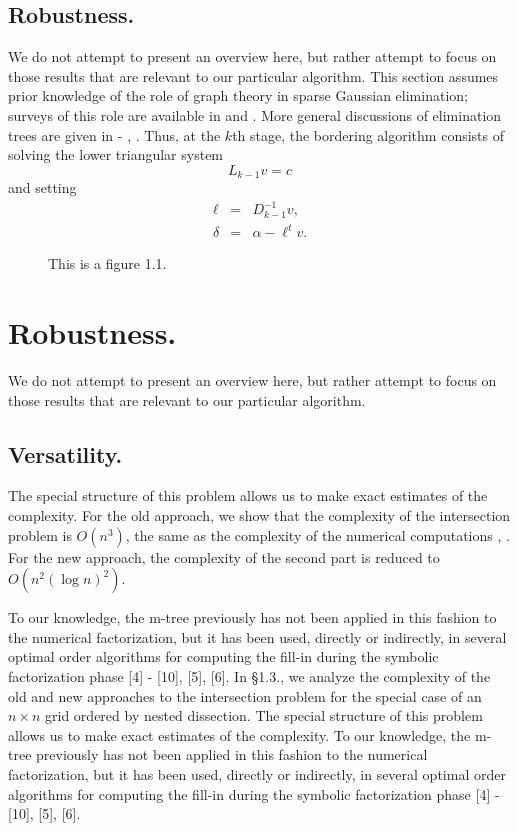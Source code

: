 \documentclass[twoside,leqno,twocolumn]{article}
\begin{document}
\subsection{Robustness.}We do not
attempt to present an overview
here, but rather attempt to focus on those results that
are relevant to our particular algorithm.
This section assumes prior knowledge of the role of graph theory
in sparse Gaussian elimination; surveys of this role are
available in \cite{ROSE72} and \cite{GEORGELIU}. More general
discussions of elimination trees are given in
\cite{LAW} - \cite{LIU2}, \cite{SCHREIBER}.
Thus, at the $k$th stage, the bordering algorithm consists of
solving the lower triangular system
\begin{equation} \label{1.2}
 L_{k-1}v = c
\end{equation}
and setting
\begin{eqnarray} 
\ell &=& D^{-1}_{k-1}v , \\
\delta &=& \alpha - \ell^{t} v .
\end{eqnarray}

\begin{figure}
\vspace{14pc}
\caption{This is a figure 1.1.}
\end{figure}

\section{Robustness.} We do not
attempt to present an overview
here, but rather attempt to focus on those results that
are relevant to our particular algorithm.
 
\subsection{Versatility.}The special
structure of this problem allows us to make exact estimates of
the complexity.  For the old approach, we show that the
complexity of the intersection problem is $O(n^{3})$, the same
as the complexity of the numerical computations
\cite{GEORGELIU}, \cite{ROSEWHITTEN}.  For the
new approach, the complexity of the second part is reduced to
$O(n^{2} (\log n)^{2})$. 

To our knowledge, the m-tree previously has not been applied in this
fashion to the numerical factorization, but it has been used,
directly or indirectly, in several optimal order algorithms for
computing the fill-in during the symbolic factorization phase
[4] - [10], [5], [6]. In \S 1.3., we analyze the complexity of the old and new
approaches to the intersection problem for the special case of
an $n \times n$ grid ordered by nested dissection. The special
structure of this problem allows us to make exact estimates of
the complexity. To our knowledge, the m-tree previously has not been applied in this
fashion to the numerical factorization, but it has been used,
directly or indirectly, in several optimal order algorithms for
computing the fill-in during the symbolic factorization phase
[4] - [10], [5], [6].
\end{document}

